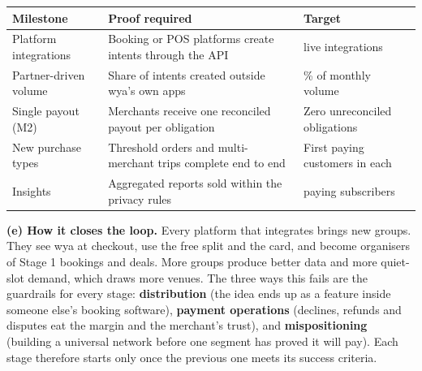\documentclass[10pt, a4paper]{report}
\begin{document}
\vspace{0.2em}
\begin{center}
\footnotesize{}
\begin{tabular}{|>{\centering\arraybackslash}p{4.0cm}|>{\raggedright\arraybackslash}p{7.2cm}|>{\raggedright\arraybackslash}p{5.8cm}|}
\hline
\rowcolor{hdrblue}
\textbf{Milestone} & \textbf{Proof required} & \textbf{Target} \\
\hline
Platform integrations & Booking or POS platforms create intents through the API & [\_\_] live integrations \\
\hline
Partner-driven volume & Share of intents created outside wya's own apps & [\_\_]\% of monthly volume \\
\hline
Single payout (M2) & Merchants receive one reconciled payout per obligation & Zero unreconciled obligations \\
\hline
\rowcolor{passgreen}
New purchase types & Threshold orders and multi-merchant trips complete end to end & First paying customers in each \\
\hline
Insights & Aggregated reports sold within the privacy rules & [\_\_] paying subscribers \\
\hline
\end{tabular}
\end{center}
\normalsize

\textbf{(e) How it closes the loop.} Every platform that integrates brings new groups. They see wya at checkout, use the free split and the card, and become organisers of Stage 1 bookings and deals. More groups produce better data and more quiet-slot demand, which draws more venues. The three ways this fails are the guardrails for every stage: \textbf{distribution} (the idea ends up as a feature inside someone else's booking software), \textbf{payment operations} (declines, refunds and disputes eat the margin and the merchant's trust), and \textbf{mispositioning} (building a universal network before one segment has proved it will pay). Each stage therefore starts only once the previous one meets its success criteria.
\end{document}
